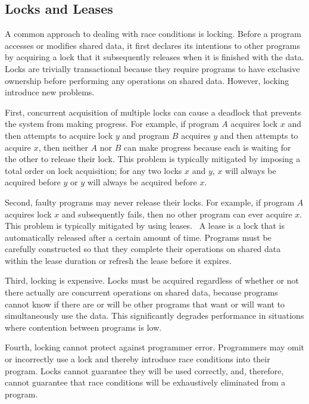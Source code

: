 \documentclass[../main.tex]{subfiles}
\begin{document}
  \subsection{Locks and Leases}
  A common approach to dealing with race conditions is locking. Before a program accesses or
  modifies shared data, it first declares its intentions to other programs by acquiring a
  lock that it subsequently releases when it is finished with the data. Locks are trivially
  transactional because they require programs to have exclusive ownership before performing any
  operations on shared data. However, locking introduce new problems.

  First, concurrent acquisition of multiple locks can cause a deadlock that prevents the system from
  making progress. For example, if program $A$ acquires lock $x$ and then attempts to acquire lock
  $y$ and program $B$ acquires $y$ and then attempts to acquire $x$, then neither $A$ nor $B$ can
  make progress because each is waiting for the other to release their lock. This problem is
  typically mitigated by imposing a total order on lock acquisition; for any two locks $x$ and $y$,
  $x$ will always be acquired before $y$ or $y$ will always be acquired before $x$.

  Second, faulty programs may never release their locks. For example, if program $A$ acquires lock
  $x$ and subsequently fails, then no other program can ever acquire $x$. This problem is typically
  mitigated by using leases.~\cite{leases} A lease is a lock that is automatically released after a
  certain amount of time. Programs must be carefully constructed so that they complete their
  operations on shared data within the lease duration or refresh the lease before it expires.

  Third, locking is expensive. Locks must be acquired regardless of whether or not there actually
  are concurrent operations on shared data, because programs cannot know if there are or will be
  other programs that want or will want to simultaneously use the data. This significantly degrades
  performance in situations where contention between programs is low.

  Fourth, locking cannot protect against programmer error. Programmers may omit or incorrectly use a
  lock and thereby introduce race conditions into their program. Locks cannot guarantee they will be
  used correctly, and, therefore, cannot guarantee that race conditions will be exhaustively
  eliminated from a program.
\end{document}
